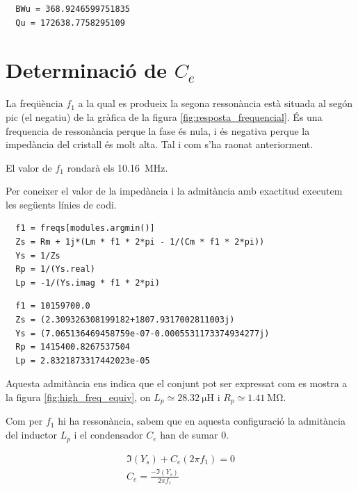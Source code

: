 \documentclass[catalan, a4paper, nobib]{tufte-handout}
\begin{document}
\begin{verbatim}
  BWu = 368.9246599751835
  Qu = 172638.7758295109
\end{verbatim}

\section{Determinació de $C_e$}

 La freqüència $f_1$ a la qual es produeix la segona ressonància està situada al segón pic (el negatiu) de la gràfica de la figura \ref{fig:resposta_frequencial}. És una frequencia de ressonància perque la fase és nula, i és negativa perque la impedància del cristall és molt alta. Tal i com s'ha raonat anteriorment.

\newthought{} El valor de $f_1$ rondarà els \qty{10.16}{\mega\hertz}.

\newthought{} Per coneixer el valor de la impedància i la admitància amb exactitud executem les següents línies de codi.

\begin{verbatim}
  f1 = freqs[modules.argmin()]
  Zs = Rm + 1j*(Lm * f1 * 2*pi - 1/(Cm * f1 * 2*pi))
  Ys = 1/Zs
  Rp = 1/(Ys.real)
  Lp = -1/(Ys.imag * f1 * 2*pi)
\end{verbatim}

\begin{verbatim}
  f1 = 10159700.0
  Zs = (2.309326308199182+1807.9317002811003j)
  Ys = (7.065136469458759e-07-0.0005531173374934277j)
  Rp = 1415400.8267537504
  Lp = 2.8321873317442023e-05
\end{verbatim}

\newthought{} Aquesta admitància ens indica que el conjunt pot ser expressat com es mostra a la figura \ref{fig:high_freq_equiv}, on $L_p \simeq \qty{28.32}{\micro\henry}$ i $R_p \simeq \qty{1.41}{\mega\ohm}$.

\newthought{} Com per $f_1$ hi ha ressonància, sabem que en aquesta configuració la admitància del inductor $L_p$ i el condensador $C_e$ han de sumar $0$.

\begin{gather*}
  \Im (Y_s) + C_e(2\pi f_1) = 0 \\
  C_e = \frac{- \Im (Y_s)}{2\pi f_1}
\end{gather*}
\end{document}
